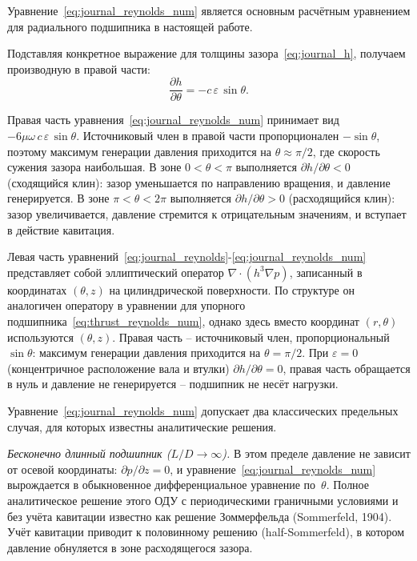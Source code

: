 Уравнение~\eqref{eq:journal_reynolds_num} является основным расчётным уравнением для радиального подшипника в настоящей работе.

Подставляя конкретное выражение для толщины зазора~\eqref{eq:journal_h}, получаем производную в правой части:
\begin{equation}
\frac{\partial h}{\partial \theta} = -c\,\varepsilon\,\sin\theta.
\label{eq:journal_dh_dtheta}
\end{equation}

Правая часть уравнения~\eqref{eq:journal_reynolds_num} принимает вид $-6\mu\omega\,c\,\varepsilon\,\sin\theta$. Источниковый член в правой части пропорционален $-\sin\theta$, поэтому максимум генерации давления приходится на $\theta \approx \pi/2$, где скорость сужения зазора наибольшая. В зоне $0 < \theta < \pi$ выполняется $\partial h/\partial\theta < 0$ (сходящийся клин): зазор уменьшается по направлению вращения, и давление генерируется. В зоне $\pi < \theta < 2\pi$ выполняется $\partial h/\partial\theta > 0$ (расходящийся клин): зазор увеличивается, давление стремится к отрицательным значениям, и вступает в действие кавитация.

Левая часть уравнений~\eqref{eq:journal_reynolds}-\eqref{eq:journal_reynolds_num} представляет собой эллиптический оператор $\nabla \cdot (h^3 \nabla p)$, записанный в координатах $(\theta, z)$ на цилиндрической поверхности. По структуре он аналогичен оператору в уравнении для упорного подшипника~\eqref{eq:thrust_reynolds_num}, однако здесь вместо координат $(r, \theta)$ используются $(\theta, z)$. Правая часть -- источниковый член, пропорциональный $\sin\theta$: максимум генерации давления приходится на $\theta = \pi/2$. При $\varepsilon = 0$ (концентричное расположение вала и втулки) $\partial h/\partial \theta = 0$, правая часть обращается в нуль и давление не генерируется -- подшипник не несёт нагрузки.

Уравнение~\eqref{eq:journal_reynolds_num} допускает два классических предельных случая, для которых известны аналитические решения.

\textit{Бесконечно длинный подшипник ($L/D \to \infty$).} В этом пределе давление не зависит от осевой координаты: $\partial p/\partial z = 0$, и уравнение~\eqref{eq:journal_reynolds_num} вырождается в обыкновенное дифференциальное уравнение по~$\theta$. Полное аналитическое решение этого ОДУ с периодическими граничными условиями и без учёта кавитации известно как решение Зоммерфельда (Sommerfeld, 1904). Учёт кавитации приводит к половинному решению (half-Sommerfeld), в котором давление обнуляется в зоне расходящегося зазора.


